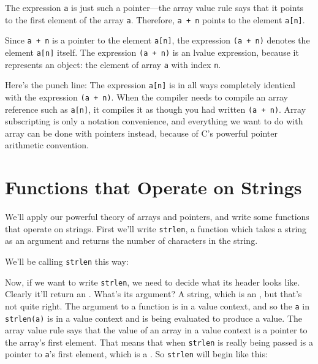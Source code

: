 The expression {\tt a} is just such a pointer---the array value rule
says that it points to the first element of the array {\tt a}.
Therefore, {\tt a + n} points to the element {\tt a[n]}.  

Since {\tt a + n} is a pointer to the element {\tt a[n]}, the expression
{\tt *(a + n)} denotes the element {\tt a[n]} itself.  The expression
{\tt *(a + n)} is an lvalue expression, because it represents an object:
the element of array {\tt a} with index {\tt n}.

\label{pointer-punch-line}
Here's the punch line:  The expression {\tt a[n]} is in all ways
completely identical  with the expression {\tt *(a + n)}.  When the
compiler needs to compile an array reference such as {\tt a[n]}, it
compiles it as though you had written {\tt *(a + n)}.  Array
subscripting is only a notation convenience, and everything we want to
do with array can be done with pointers instead, because of C's powerful
pointer arithmetic convention.

\section{Functions that Operate on Strings}

We'll apply our powerful theory of arrays and pointers, and write some
functions that operate on strings.  First we'll write {\tt strlen}, a
function which takes a string as an argument and returns the number of
characters in the string.  

We'll be calling {\tt strlen} this way:
\begin{flushleft}
\verb% char a[] = "Jean Ogrinz";% \\*
\verb% int length; % \\*
\verb% % \\*
\verb% length = strlen(a);% \\*
\verb% % \\*
\end{flushleft}

Now, if we want to write {\tt strlen}, we need to decide what its header
looks like.  Clearly it'll return an \int.  What's its argument?  A
string, which is an \ao\Char, but that's not quite right.  The argument
to a function is in a value context, and so the {\tt a} in {\tt
strlen(a)} is in a value context and is being evaluated to produce a
value.  The array value rule says that the value of an array in a value
context is a pointer to the array's first element.  That means that when
{\tt strlen} is really being passed is a pointer to {\tt a}'s first
element, which is a \Char.  So {\tt strlen} will begin like this:

